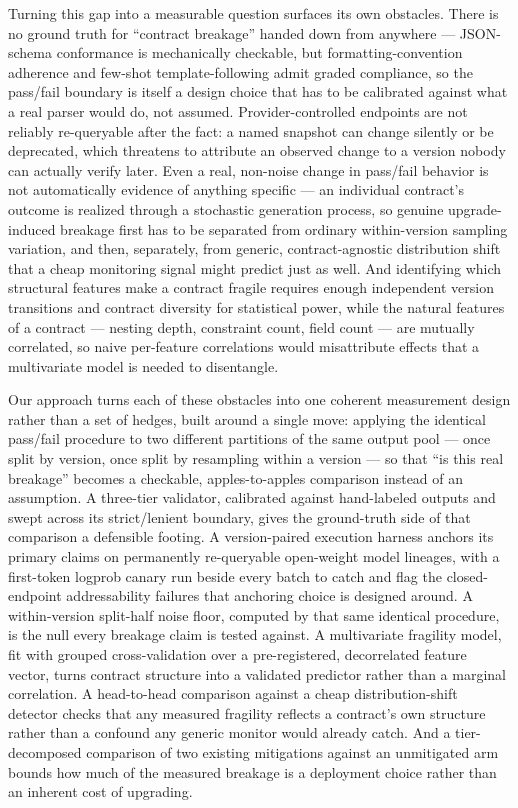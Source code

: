 \documentclass[11pt]{article}
\begin{document}
Turning this gap into a measurable question surfaces its own obstacles. There is no ground truth for ``contract breakage'' handed down from anywhere --- JSON-schema conformance is mechanically checkable, but formatting-convention adherence and few-shot template-following admit graded compliance, so the pass/fail boundary is itself a design choice that has to be calibrated against what a real parser would do, not assumed. Provider-controlled endpoints are not reliably re-queryable after the fact: a named snapshot can change silently or be deprecated, which threatens to attribute an observed change to a version nobody can actually verify later. Even a real, non-noise change in pass/fail behavior is not automatically evidence of anything specific --- an individual contract's outcome is realized through a stochastic generation process, so genuine upgrade-induced breakage first has to be separated from ordinary within-version sampling variation, and then, separately, from generic, contract-agnostic distribution shift that a cheap monitoring signal might predict just as well. And identifying which structural features make a contract fragile requires enough independent version transitions and contract diversity for statistical power, while the natural features of a contract --- nesting depth, constraint count, field count --- are mutually correlated, so naive per-feature correlations would misattribute effects that a multivariate model is needed to disentangle.

Our approach turns each of these obstacles into one coherent measurement design rather than a set of hedges, built around a single move: applying the identical pass/fail procedure to two different partitions of the same output pool --- once split by version, once split by resampling within a version --- so that ``is this real breakage'' becomes a checkable, apples-to-apples comparison instead of an assumption. A three-tier validator, calibrated against hand-labeled outputs and swept across its strict/lenient boundary, gives the ground-truth side of that comparison a defensible footing. A version-paired execution harness anchors its primary claims on permanently re-queryable open-weight model lineages, with a first-token logprob canary run beside every batch to catch and flag the closed-endpoint addressability failures that anchoring choice is designed around. A within-version split-half noise floor, computed by that same identical procedure, is the null every breakage claim is tested against. A multivariate fragility model, fit with grouped cross-validation over a pre-registered, decorrelated feature vector, turns contract structure into a validated predictor rather than a marginal correlation. A head-to-head comparison against a cheap distribution-shift detector checks that any measured fragility reflects a contract's own structure rather than a confound any generic monitor would already catch. And a tier-decomposed comparison of two existing mitigations against an unmitigated arm bounds how much of the measured breakage is a deployment choice rather than an inherent cost of upgrading.
\end{document}
